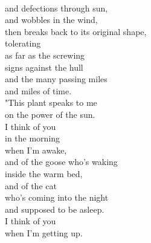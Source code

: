 \documentclass[smalldemyvopaper,11pt,twoside,onecolumn,openright,extrafontsizes]{memoir}
\begin{document}
\\and defections through sun,
\\and wobbles in the wind,
\\then breaks back to its original shape,
\\tolerating
\\as far as the screwing
\\signs against the hull
\\and the many passing miles
\\and miles of time.
\\"This plant speaks to me
\\on the power of the sun.
\\I think of you
\\in the morning
\\when I'm awake,
\\and of the goose who's waking
\\inside the warm bed,
\\and of the cat
\\who's coming into the night
\\and supposed to be asleep.
\\I think of you
\\when I'm getting up.
\end{document}

